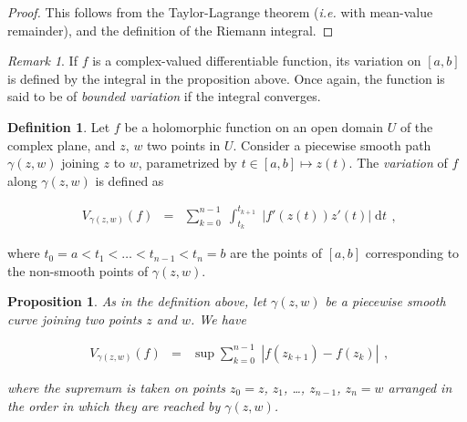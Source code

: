 \documentclass{jams-l}
\newtheorem{proposition}[theorem]{Proposition}
\theoremstyle{definition}
\newtheorem{definition}[theorem]{Definition}
\theoremstyle{remark}
\newtheorem{remark}[theorem]{Remark}
\numberwithin{equation}{section}
\begin{document}
        \begin{proof}
        
            This follows from the Taylor-Lagrange theorem (\textit{i.e.} with mean-value remainder), and the definition of the Riemann integral.
        
        \end{proof}
        
        \begin{remark}
        
            If $f$ is a complex-valued differentiable function, its variation on $\left[ a,b \right]$ is defined by the integral in the proposition above. Once again, the function is said to be of \textit{bounded variation} if the integral converges.
        
        \end{remark}
        
        \begin{definition}
        
            Let $f$ be a holomorphic function on an open domain $U$ of the complex plane, and $z$, $w$ two points in $U$. Consider a piecewise smooth path $\gamma \left( z,w \right)$ joining $z$ to $w$, parametrized by $t \in \left[ a,b \right] \mapsto z \left( t \right)$. The \textit{variation} of $f$ along $\gamma \left( z,w \right)$ is defined as
            
            \[ \begin{array}{ccc}
                    V_{\gamma \left( z,w \right)} \left( f \right) & = & \sum\limits_{k=0}^{n-1} \; \int_{t_k}^{t_{k+1}} \; \left \vert f' \left( z \left( t \right) \right) z' \left( t \right) \right \vert \; \mathrm{d}t
                \end{array} , \]
            
            \noindent where $t_0 = a < t_1 < \dots < t_{n-1} < t_n = b$ are the points of $\left[ a,b \right]$ corresponding to the non-smooth points of $\gamma \left( z,w \right)$.
        
        \end{definition}
        
        \begin{proposition}
        
            As in the definition above, let $\gamma \left( z,w \right)$ be a piecewise smooth curve joining two points $z$ and $w$. We have
            
            \[ \begin{array}{ccc}
                    V_{\gamma \left( z,w \right)} \left( f \right) & = & \sup \sum\limits_{k=0}^{n-1} \; \left \vert f \left( z_{k+1} \right) - f \left( z_k \right) \right \vert
                \end{array} , \]
            
            \noindent where the supremum is taken on points $z_0 = z$, $z_1$, \dots, $z_{n-1}$, $z_n = w$ arranged in the order in which they are reached by $\gamma \left( z, w\right)$.
        
        \end{proposition}
        
\end{document}
